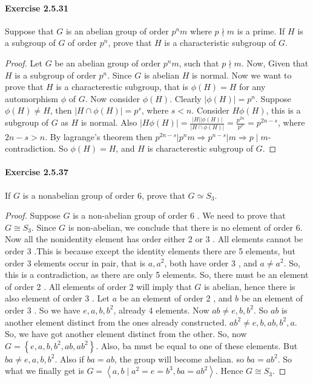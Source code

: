 \documentclass{article}
\begin{document}
\paragraph{Exercise 2.5.31} Suppose that $G$ is an abelian group of order $p^nm$ where $p \nmid m$ is a prime.  If $H$ is a subgroup of $G$ of order $p^n$, prove that $H$ is a characteristic subgroup of $G$.
\begin{proof}
    Let $G$ be an abelian group of order $p^n m$, such that $p \nmid m$. Now, Given that $H$ is a subgroup of order $p^n$. Since $G$ is abelian $H$ is normal. Now we want to prove that $H$ is a characterestic subgroup, that is $\phi(H)=H$ for any automorphism $\phi$ of $G$. Now consider $\phi(H)$. Clearly $|\phi(H)|=p^n$. Suppose $\phi(H) \neq H$, then $|H \cap \phi(H)|=p^s$, where $s<n$. Consider $H \phi(H)$, this is a subgroup of $G$ as $H$ is normal. Also $|H \phi(H)|=\frac{|H||\phi(H)|}{|H \cap \phi(H)|}=\frac{p^{2 n}}{p^s}=p^{2 n-s}$, where $2 n-s>n$. By lagrange's theorem then $p^{2 n-s}\left|p^n m \Longrightarrow p^{n-s}\right| m \Longrightarrow p \mid m$-contradiction. So $\phi(H)=H$, and $H$ is characterestic subgroup of $G$.
\end{proof}



\paragraph{Exercise 2.5.37} If $G$ is a nonabelian group of order 6, prove that $G \simeq S_3$.
\begin{proof}
    Suppose $G$ is a non-abelian group of order 6 . We need to prove that $G \cong S_3$. Since $G$ is non-abelian, we conclude that there is no element of order 6. Now all the nonidentity element has order either 2 or 3 . All elements cannot be order 3 .This is because except the identity elements there are 5 elements, but order 3 elements occur in pair, that is $a, a^2$, both have order 3 , and $a \neq a^2$. So, this is a contradiction, as there are only 5 elements. So, there must be an element of order 2 . All elements of order 2 will imply that $G$ is abelian, hence there is also element of order 3 . Let $a$ be an element of order 2 , and $b$ be an element of order 3 . So we have $e, a, b, b^2$, already 4 elements. Now $a b \neq e, b, b^2$. So $a b$ is another element distinct from the ones already constructed. $a b^2 \neq e, b, a b, b^2, a$. So, we have got another element distinct from the other. So, now $ G=\left\{e, a, b, b^2, a b, a b^2\right\}$. Also, ba must be equal to one of these elements. But $b a \neq e, a, b, b^2$. Also if $b a=a b$, the group will become abelian. so $b a=a b^2$. So what we finally get is $G=\left\langle a, b \mid a^2=e=b^3, b a=a b^2\right\rangle$. Hence $G \cong S_3$.
\end{proof}
\end{document}
